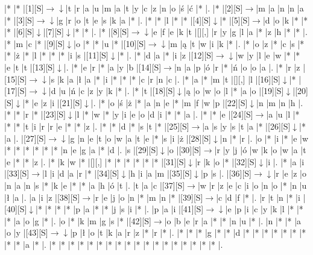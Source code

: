 \documentclass[11pt]{article}
\newcommand\drarr{$\rightarrow \!\!\!\!\! \downarrow$}
\newcommand\rarr{$\rightarrow$}
\newcommand\darr{$\downarrow$}
\begin{document}
\noindent\begin{Puzzle}{17}{28}|*	|*	|[1][S]\drarr	|t	|r	|a	|u	|m	|a	|t	|y	|c	|z	|n	|o	|ś	|ć	|*	|.
|*	|[2][S]\rarr	|m	|a	|n	|n	|a	|*	|[3][S]\drarr	|g	|r	|o	|t	|e	|s	|k	|a	|*	|.
|*	|*	|l	|*	|*	|[4][S]\darr	|*	|[5][S]\rarr	|d	|o	|k	|*	|*	|*	|[6][S]\darr	|[7][S]\darr	|*	|*	|.
|*	|[8][S]\drarr	|e	|f	|e	|k	|t	|[][,]{ }	|r	|y	|g	|l	|a	|*	|z	|h	|*	|*	|.
|*	|m	|c	|*	|[9][S]\darr	|o	|*	|*	|u	|*	|[10][S]\drarr	|m	|ą	|t	|w	|i	|k	|*	|.
|*	|o	|z	|*	|c	|s	|*	|*	|ż	|*	|l	|*	|*	|*	|i	|s	|[11][S]\darr	|*	|.
|*	|d	|a	|*	|i	|z	|[12][S]\drarr	|w	|y	|l	|e	|w	|*	|*	|e	|t	|t	|[13][S]\darr	|.
|*	|e	|r	|*	|a	|y	|b	|[14][S]\rarr	|n	|a	|p	|ó	|r	|*	|ń	|o	|o	|a	|.
|*	|r	|z	|[15][S]\drarr	|s	|k	|a	|ł	|a	|*	|i	|*	|*	|*	|c	|r	|n	|c	|.
|*	|a	|*	|m	|t	|[][,]{ }	|l	|[16][S]\darr	|*	|[17][S]\drarr	|d	|u	|ń	|c	|z	|y	|k	|*	|.
|*	|t	|[18][S]\darr	|ą	|o	|w	|o	|l	|*	|a	|o	|[19][S]\darr	|[20][S]\darr	|*	|e	|z	|i	|[21][S]\darr	|.
|*	|o	|ś	|ż	|*	|a	|n	|e	|*	|m	|f	|w	|p	|[22][S]\darr	|n	|m	|n	|h	|.
|*	|*	|r	|*	|[23][S]\darr	|l	|*	|w	|*	|y	|i	|e	|o	|d	|i	|*	|*	|a	|.
|*	|*	|e	|[24][S]\rarr	|a	|u	|l	|*	|*	|*	|t	|i	|r	|r	|e	|*	|*	|z	|.
|*	|*	|d	|*	|s	|t	|*	|[25][S]\rarr	|a	|s	|y	|s	|t	|a	|*	|[26][S]\darr	|*	|a	|.
|[27][S]\drarr	|g	|n	|e	|t	|o	|w	|a	|t	|e	|*	|s	|i	|ż	|[28][S]\darr	|n	|*	|r	|.
|o	|*	|i	|*	|e	|w	|*	|*	|*	|*	|*	|*	|n	|e	|g	|a	|*	|d	|.
|s	|[29][S]\darr	|o	|[30][S]\rarr	|r	|y	|j	|ó	|w	|k	|o	|w	|a	|t	|e	|*	|*	|z	|.
|*	|k	|w	|*	|[][,]{ }	|*	|*	|*	|*	|*	|*	|[31][S]\darr	|r	|k	|o	|*	|[32][S]\darr	|i	|.
|*	|a	|i	|[33][S]\rarr	|l	|i	|d	|a	|r	|*	|[34][S]\darr	|h	|i	|a	|m	|[35][S]\darr	|p	|s	|.
|[36][S]\drarr	|r	|e	|z	|o	|n	|a	|n	|s	|*	|k	|e	|*	|*	|a	|h	|ó	|t	|.
|t	|a	|c	|[37][S]\rarr	|w	|r	|z	|e	|c	|i	|o	|n	|o	|*	|n	|u	|ł	|a	|.
|a	|i	|z	|[38][S]\rarr	|r	|e	|j	|o	|n	|*	|m	|n	|*	|[39][S]\rarr	|c	|d	|f	|*	|.
|r	|t	|n	|*	|i	|[40][S]\darr	|*	|*	|*	|*	|p	|a	|*	|*	|j	|s	|i	|*	|.
|p	|a	|i	|[41][S]\drarr	|e	|p	|i	|c	|y	|k	|l	|*	|*	|*	|a	|o	|g	|*	|.
|o	|*	|k	|m	|g	|s	|*	|[42][S]\rarr	|o	|b	|e	|r	|a	|*	|*	|n	|u	|*	|.
|n	|*	|*	|a	|o	|y	|[43][S]\drarr	|p	|ł	|o	|t	|k	|a	|r	|z	|*	|r	|*	|.
|*	|*	|*	|g	|*	|*	|d	|*	|*	|*	|*	|*	|*	|*	|*	|*	|a	|*	|.
|*	|*	|*	|*	|*	|*	|*	|*	|*	|*	|*	|*	|*	|*	|*	|*	|*	|*	|.\end{Puzzle}

\newpage
\end{document}
